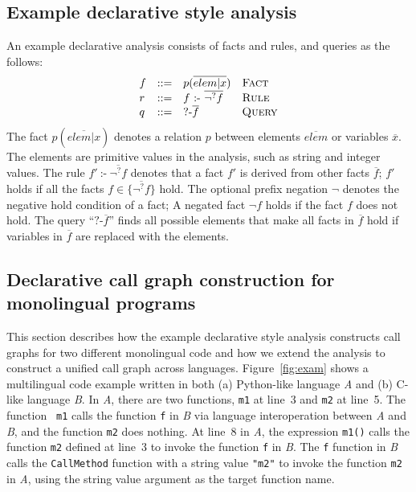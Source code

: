\subsection{Example declarative style analysis}
An example declarative analysis consists of facts and rules, and queries as the
follows:
\[
  \begin{array}{llll}
    f & ::= & p(\overline{elem | x}) & \text{\sc Fact}\\
    r & ::= & f\ \mbox{:-}\ \overline{\neg^? f} & \text{\sc Rule}\\
    q & ::= & \mbox{?-} \overline{f}\ &  \text{\sc Query}
\end{array}
\]
The fact $p(\overline{elem | x})$ denotes a relation $p$ between elements
$\overline{elem}$ or variables $\overline{x}$. The elements are primitive
values in the analysis, such as string and integer values.  The rule $f'\
\mbox{:-}\ \overline{\neg^? f}$ denotes that a fact $f'$ is derived from other
facts $\overline{f}$; $f'$ holds if all the facts $f \in \{\overline{\neg^?
f}\}$ hold. The optional prefix negation $\neg$ denotes the negative hold
condition of a fact; A negated fact $\neg f$ holds if the fact $f$ does not
hold. The query ``$\mbox{?-} \overline{f}$'' finds all possible elements that
make all facts in $\overline{f}$ hold if variables in $\overline{f}$ are
replaced with the elements.


\subsection{Declarative call graph construction for monolingual programs}\label{lab:ovmono}


This section describes how the example declarative style analysis constructs call graphs
for two different monolingual code and how we extend the analysis to construct
a unified call graph across languages.
Figure~\ref{fig:exam} shows a multilingual code example written in both (a)
Python-like language {\it A} and (b) C-like language {\it B}. In {\it A}, there
are two functions, {\tt m1} at line~3 and {\tt m2} at line~5. The function {\tt
m1} calls the function {\tt f} in {\it B} via language interoperation between
{\it A} and {\it B}, and the function {\tt m2} does nothing. At line~8 in {\it
A}, the expression {\tt m1()} calls the function {\tt m2} defined at line~3 to
invoke the function {\tt f} in {\it B}.
The {\tt f} function in {\it B} calls the {\tt CallMethod} function with a
string value {\tt "m2"} to invoke the function {\tt m2} in {\it A}, using the
string value argument as the target function name.



